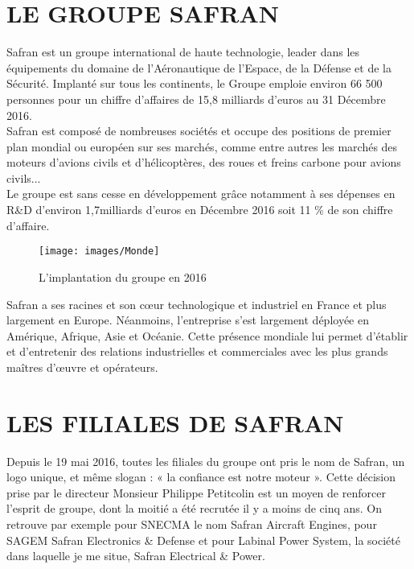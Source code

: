 \section{LE GROUPE SAFRAN }

Safran est un groupe international de haute technologie, leader dans les équipements du domaine de l'Aéronautique de l'Espace, de la Défense et de la Sécurité. Implanté sur tous les continents, le Groupe emploie environ 66 500 personnes pour un chiffre d'affaires de 15,8 milliards d'euros au 31 Décembre 2016.\\

Safran est composé de nombreuses sociétés et occupe des positions de premier plan mondial ou européen sur ses marchés, comme entre autres les marchés des moteurs d’avions civils et d’hélicoptères, des roues et freins carbone pour avions civils... \\

Le groupe est sans cesse en développement grâce notamment à ses dépenses en R\&D d’environ 1,7milliards d’euros en Décembre 2016 soit 11 \% de son chiffre d’affaire.\\


\begin{figure}[!h]
\begin{center}
\texttt{[image: images/Monde]}
\end{center}
\caption{L'implantation du groupe en 2016}
\end{figure}


Safran a ses racines et son cœur technologique et industriel en France et plus largement en Europe. Néanmoins, l’entreprise s’est largement déployée en Amérique, Afrique, Asie et Océanie. Cette présence mondiale lui permet d’établir et d’entretenir des relations industrielles et commerciales avec les plus grands maîtres d’œuvre et opérateurs.\\



\section{ LES FILIALES DE SAFRAN}

Depuis le 19 mai 2016, toutes les filiales du groupe ont pris le nom de Safran, un logo unique, et même slogan : « la confiance est notre moteur ». Cette décision prise par le directeur Monsieur Philippe Petitcolin est un moyen de renforcer l’esprit de groupe, dont la moitié a été recrutée il y a moins de cinq ans. On retrouve par exemple pour SNECMA le nom Safran Aircraft Engines, pour SAGEM Safran Electronics \& Defense et pour Labinal Power System, la société dans laquelle je me situe, Safran Electrical \& Power.\\ 

